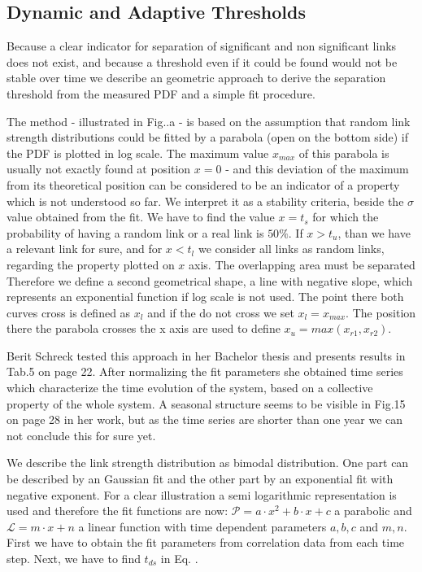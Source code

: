 \documentclass[a4paper,10pt]{scrbook}
\begin{document}
\subsection{Dynamic and Adaptive Thresholds}
\label{sec.adaptiveThreshold}

Because a clear indicator for separation of significant and non significant links does not exist, and because a threshold even if it could be found would not be stable over time we describe an geometric approach to derive the separation threshold from the measured PDF and a simple fit procedure. 

The method - illustrated in Fig.\label{fig.DynamicThreshhold}.a - is based on the assumption that random link strength distributions could be fitted by a parabola (open on the bottom side) if the PDF is plotted in log scale. The maximum value $x_{max}$ of this parabola is usually not exactly found at position $x=0$ - and this deviation of the maximum from its theoretical position can be considered to be an indicator of a property which is not understood so far. We interpret it as a stability criteria, beside the $\sigma$ value obtained from the fit. We have to find the value $x=t_s$ for which the probability of having a random link or a real link is $50\%$. If $x>t_u$, than we have a relevant link for sure, and for $x<t_l$ we consider all links as random links, regarding the property plotted on $x$ axis. The overlapping area must be separated Therefore we define a second geometrical shape, a line with negative slope, which represents an exponential function if log scale is not used. The point there both curves cross is defined as $x_l$ and if the do not cross we set $x_l = x_{max}$. The position there the parabola crosses the x axis are used to define $x_u = max( x_{r1}, x_{r2})$.

Berit Schreck tested this approach in her Bachelor thesis \cite{Schreck.BA} and presents results in Tab.5 on page 22. After normalizing the fit parameters she obtained time series which characterize the time evolution of the system, based on a collective property of the whole system. A seasonal structure seems to be visible in Fig.15 on page 28 in her work, but as the time series are shorter than one year we can not conclude this for sure yet. 

\label{ext.fig.DynamicThreshhold} 


We describe the link strength distribution as bimodal distribution. One part can be described by an Gaussian fit and the other part by an exponential fit with negative exponent. For a clear illustration a semi logarithmic representation is used and therefore the fit functions are now: $\mathcal{P} = a \cdot x^2 + b \cdot x + c$ a parabolic and 
$\mathcal{L} = m \cdot x + n$ a linear function with time dependent parameters $a,b,c$ and $m,n$. First we have to obtain the fit parameters from correlation data from each time step. Next, we have to find $t_{ds}$ in Eq. \label{eqthreshold}.
\end{document}
